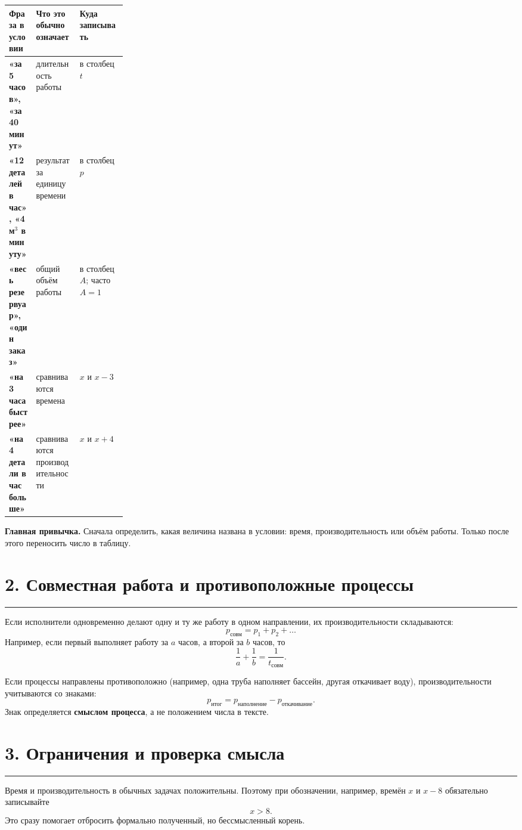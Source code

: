 \documentclass[a4paper,12pt]{article}
\newcommand{\sectionrule}{\par\vspace{-0.25em}\noindent\textcolor{accent}{\rule{\linewidth}{0.6pt}}\par\vspace{0.25em}}
\newcommand{\key}[1]{\textcolor{darkaccent}{\textbf{#1}}}
\begin{document}
\begin{table}[h]
\centering
\renewcommand{\arraystretch}{1.3}
\begin{tabularx}{\linewidth}{@{}>{\raggedright\arraybackslash\bfseries}p{0.23\linewidth} X X@{}}
\toprule
Фраза в условии & Что это обычно означает & Куда записывать \\
\midrule
«за 5 часов», «за 40 минут» & длительность работы & в столбец $t$ \\
«12 деталей в час», «4 м$^3$ в минуту» & результат за единицу времени & в столбец $p$ \\
«весь резервуар», «один заказ» & общий объём работы & в столбец $A$; часто $A=1$ \\
«на 3 часа быстрее» & сравниваются времена & $x$ и $x-3$ \\
«на 4 детали в час больше» & сравниваются производительности & $x$ и $x+4$ \\
\bottomrule
\end{tabularx}
\end{table}

\key{Главная привычка.} Сначала определить, какая величина названа в условии: время, производительность или объём работы. Только после этого переносить число в таблицу.

\section*{2. Совместная работа и противоположные процессы}
\sectionrule

Если исполнители одновременно делают одну и ту же работу в одном направлении, их производительности складываются:
\[
p_{\text{совм}}=p_1+p_2+\dots
\]
Например, если первый выполняет работу за $a$ часов, а второй за $b$ часов, то
\[
\frac1a+\frac1b=\frac1{t_{\text{совм}}}.
\]

Если процессы направлены противоположно (например, одна труба наполняет бассейн, другая откачивает воду), производительности учитываются со знаками:
\[
p_{\text{итог}}=p_{\text{наполнение}}-p_{\text{откачивание}}.
\]
Знак определяется \key{смыслом процесса}, а не положением числа в тексте.

\section*{3. Ограничения и проверка смысла}
\sectionrule

Время и производительность в обычных задачах положительны. Поэтому при обозначении, например, времён $x$ и $x-8$ обязательно записывайте
\[
x>8.
\]
Это сразу помогает отбросить формально полученный, но бессмысленный корень.
\end{document}
